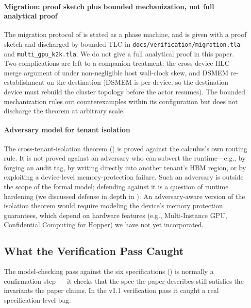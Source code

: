 \paragraph{Migration: proof sketch plus bounded mechanization, not
full analytical proof}
The migration protocol of  is stated as a phase
machine, and  is given with a proof
sketch and discharged by bounded TLC in
\texttt{docs/verification/migration.tla} and
\texttt{multi\_gpu\_k2k.tla}.  We do not give a full analytical
proof in this paper.  Two complications are left to a companion
treatment: the cross-device HLC merge argument of
 under non-negligible host
wall-clock skew, and DSMEM re-establishment on the destination
(DSMEM is per-device, so the destination device must rebuild the
cluster topology before the actor resumes).  The bounded
mechanization rules out counterexamples within its configuration
but does not discharge the theorem at arbitrary scale.

\paragraph{Adversary model for tenant isolation}
The cross-tenant-isolation theorem
() is proved against the calculus's
own routing rule.  It is not proved against an adversary who can
subvert the runtime—e.g., by forging an audit tag, by writing
directly into another tenant's HBM region, or by exploiting a
device-level memory-protection failure.  Such an adversary is
outside the scope of the formal model; defending against it is a
question of runtime hardening (we discussed defense in depth in
).  An adversary-aware version of the
isolation theorem would require modeling the device's memory
protection guarantees, which depend on hardware features (e.g.,
Multi-Instance GPU, Confidential Computing for Hopper) we have
not yet incorporated.

\subsection{What the Verification Pass Caught}
\label{sec:disc:tlc-bug}

The model-checking pass against the six \TLA{} specifications
() is normally a confirmation step — it checks
that the spec the paper describes still satisfies the invariants
the paper claims.  In the v1.1 verification pass it caught a real
specification-level bug.

